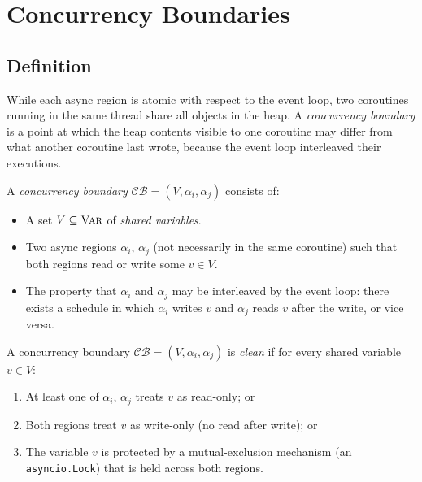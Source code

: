 \documentclass[11pt]{article}
\newcommand{\CB}{\mathcal{CB}}               %
\newcommand{\asyncRegion}[1]{\alpha_{#1}}    %
\begin{document}
\section{Concurrency Boundaries}\label{sec:conc-boundaries}

\subsection{Definition}

While each async region is atomic with respect to the event loop, two
coroutines running in the same thread share all objects in the heap.  A
\emph{concurrency boundary} is a point at which the heap contents visible
to one coroutine may differ from what another coroutine last wrote, because
the event loop interleaved their executions.

\begin{definition}\label{def:cb}
A \emph{concurrency boundary} $\CB = (V, \asyncRegion{i}, \asyncRegion{j})$
consists of:
\begin{itemize}
  \item A set $V \subseteq \textsc{Var}$ of \emph{shared variables}.
  \item Two async regions $\asyncRegion{i}$, $\asyncRegion{j}$ (not
        necessarily in the same coroutine) such that both regions read or
        write some $v \in V$.
  \item The property that $\asyncRegion{i}$ and $\asyncRegion{j}$ may be
        interleaved by the event loop: there exists a schedule in which
        $\asyncRegion{i}$ writes $v$ and $\asyncRegion{j}$ reads $v$ after
        the write, or vice versa.
\end{itemize}
\end{definition}

\begin{definition}\label{def:clean-cb}
A concurrency boundary $\CB = (V, \asyncRegion{i}, \asyncRegion{j})$ is
\emph{clean} if for every shared variable $v \in V$:
\begin{enumerate}[label=(\roman*)]
  \item At least one of $\asyncRegion{i}$, $\asyncRegion{j}$ treats $v$ as
        read-only; or
  \item Both regions treat $v$ as write-only (no read after write); or
  \item The variable $v$ is protected by a mutual-exclusion mechanism
        (\eg an \texttt{asyncio.Lock}) that is held across both regions.
\end{enumerate}
\end{definition}
\end{document}
